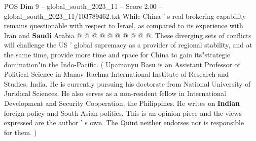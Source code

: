 \begin{textsample}{POS Dim 9 – global\_south\_2023\_11 – Score 2.00 – global\_south\_2023\_11/103789462.txt}
While China ' s real brokering capability remains questionable with respect to Israel, as compared to its experience with Iran and \textbf{Saudi} Arabia @ @ @ @ @ @ @ @ @ @.
These diverging sets of conflicts will challenge the US ' global supremacy as a provider of regional stability, and at the same time, provide more time and space for China to gain its"strategic domination"in the Indo-Pacific. ( Upamanyu Basu is an Assistant Professor of Political Science in Manav Rachna International Institute of Research and Studies, India.
He is currently pursuing his doctorate from National University of Juridical Sciences.
He also serves as a non-resident fellow in International Development and Security Cooperation, the Philippines.
He writes on \textbf{Indian} foreign policy and South Asian politics.
This is an opinion piece and the views expressed are the author ' s own.
The Quint neither endorses nor is responsible for them. )

\end{textsample}
